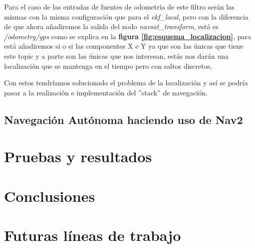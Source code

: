 Para el caso de las entradas de fuentes de odometría de este filtro serán las mismas con la misma configuración que para el 
\textit{ekf\_local}, pero con la diferencia de que ahora añadiremos la salida del nodo \textit{navsat\_transform}, está es 
\textit{/odometry/gps} como se explica en la \textbf{figura \ref{fig:esquema_localizacion}}, para está añadiremos si o si las 
componentes X e Y ya que son las únicas que tiene este topic y a parte son las únicas que nos interesan,
 estás nos darán una localización que se mantenga en el tiempo pero con saltos discretos.

Con estos tendríamos solucionado el problema de la localización y así se podría pasar a la realización e implementación del ''stack'' 
de navegación.

\section{Navegación Autónoma haciendo uso de Nav2}
 \cleardoublepage


\chapter{Pruebas y resultados}

\chapter{Conclusiones}

\chapter{Futuras líneas de trabajo}